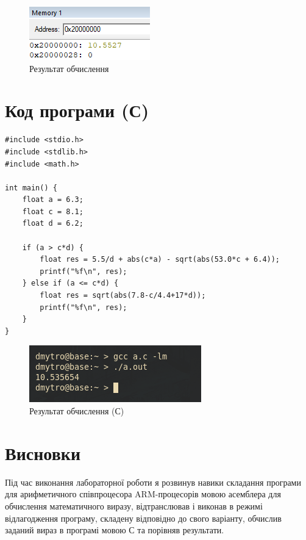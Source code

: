\documentclass{article}
\begin{document}
\begin{normalsize}
\begin{figure}[H]
	\centering
	\includegraphics[scale=0.7]{1}
	\caption{Результат обчислення}
\end{figure}

\section*{Код програми (С)}			
\begin{lstlisting}
#include <stdio.h>
#include <stdlib.h>
#include <math.h>

int main() {
	float a = 6.3;
	float c = 8.1;
	float d = 6.2;
	
	if (a > c*d) {
		float res = 5.5/d + abs(c*a) - sqrt(abs(53.0*c + 6.4));
		printf("%f\n", res);
	} else if (a <= c*d) {
		float res = sqrt(abs(7.8-c/4.4+17*d));
		printf("%f\n", res);
	}
}
\end{lstlisting}


\begin{figure}[H]
	\centering
	\includegraphics[scale=0.7]{2}
	\caption{Результат обчислення (С)}
\end{figure}
			
		\section*{Висновки}
		Під час виконання лабораторної роботи я розвинув навики складання програми для арифметичного співпроцесора ARM-процесорів мовою асемблера для обчислення математичного виразу, відтранслював і виконав в режимі відлагодження програму, складену відповідно до свого варіанту, обчислив заданий вираз в програмі мовою С та порівняв результати.
		
	\end{normalsize}
\end{document}
